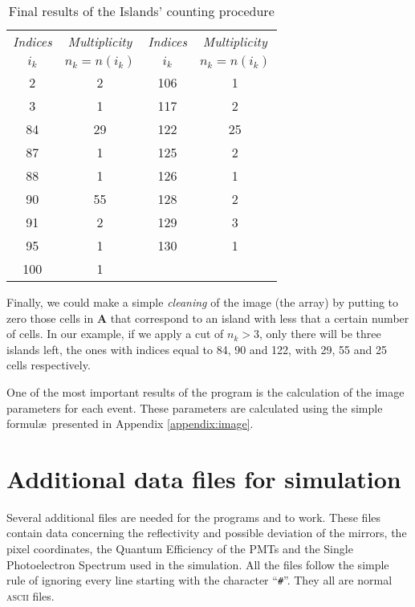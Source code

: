 \begin{table}[htbp]
\centering
\footnotesize
\begin{tabular}{|cc|cc|}
\hline
\emph{Indices} & \emph{Multiplicity} & \emph{Indices} & \emph{Multiplicity}\\
 $i_k$ & $n_k = n(i_k)$ & $i_k$ & $n_k = n(i_k)$ \\  
\hline
    2 &  2 &  106 &  1 \\
    3 &  1 &  117 &  2 \\
   84 & 29 &  122 & 25 \\
   87 &  1 &  125 &  2 \\
   88 &  1 &  126 &  1 \\
   90 & 55 &  128 &  2 \\
   91 &  2 &  129 &  3 \\
   95 &  1 &  130 &  1 \\
  100 &  1 &      &    \\
\hline
\end{tabular} 
\caption{Final results of the Islands' counting procedure}
\label{tab:islands}
\end{table}

Finally, we could make a simple \emph{cleaning} of the image (the
array) by putting to zero those cells in $\mathbf{A}$ that correspond
to an island with less that a certain number of cells. In our example,
if we apply a cut of $n_k>3$, only there will be three islands left,
the ones with indices equal to 84, 90 and 122, with 29, 55 and 25
cells respectively.

\clearpage

One of the most important results of the program \camera is the
calculation of the image parameters for each event. These parameters
are calculated using the simple formul{\ae}\ presented in Appendix
\ref{appendix:image}.

\section{Additional data files for \MC simulation}
\label{sec:addfiles}

Several additional files are needed for the programs  and
\camera to work. These files contain data concerning the reflectivity
and possible deviation of the mirrors, the pixel coordinates, the
Quantum Efficiency of the PMTs and the Single Photoelectron Spectrum
used in the simulation. All the files follow the simple rule of
ignoring every line starting with the character ``\texttt{\#}''. They
all are normal \textsc{ascii} files.

